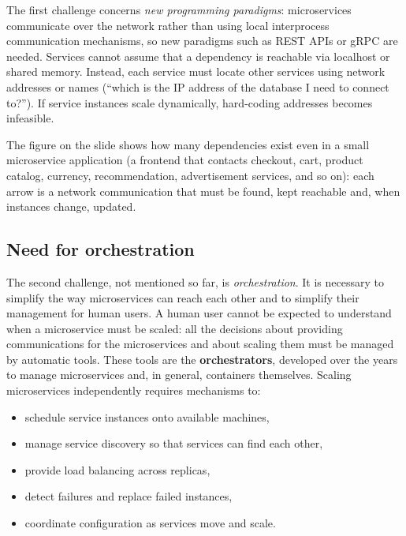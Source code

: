 The first challenge concerns \emph{new programming paradigms}: microservices communicate over the network rather than using local interprocess communication mechanisms, so new paradigms such as REST APIs or gRPC are needed. Services cannot assume that a dependency is reachable via localhost or shared memory. Instead, each service must locate other services using network addresses or names (``which is the IP address of the database I need to connect to?''). If service instances scale dynamically, hard-coding addresses becomes infeasible.

\begin{center}
\end{center}

The figure on the slide shows how many dependencies exist even in a small microservice application (a frontend that contacts checkout, cart, product catalog, currency, recommendation, advertisement services, and so on): each arrow is a network communication that must be found, kept reachable and, when instances change, updated.

\subsection{Need for orchestration}

The second challenge, not mentioned so far, is \emph{orchestration}. It is necessary to simplify the way microservices can reach each other and to simplify their management for human users. A human user cannot be expected to understand when a microservice must be scaled: all the decisions about providing communications for the microservices and about scaling them must be managed by automatic tools. These tools are the \textbf{orchestrators}, developed over the years to manage microservices and, in general, containers themselves. Scaling microservices independently requires mechanisms to:

\begin{itemize}
\item schedule service instances onto available machines,
\item manage service discovery so that services can find each other,
\item provide load balancing across replicas,
\item detect failures and replace failed instances,
\item coordinate configuration as services move and scale.
\end{itemize}

